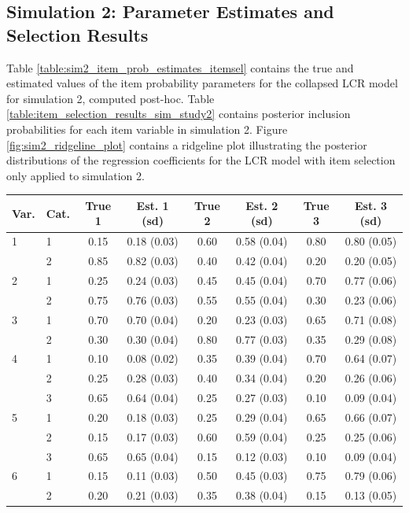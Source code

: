\documentclass[11pt]{article}
\theoremstyle{plain}
\theoremstyle{definition}
\begin{document}
\subsection{Simulation 2: Parameter Estimates and Selection Results}
Table \ref{table:sim2_item_prob_estimates_itemsel} contains the true and estimated values of the item probability parameters for the collapsed LCR model for simulation 2, computed post-hoc. Table \ref{table:item_selection_results_sim_study2} contains posterior inclusion probabilities for each item variable in simulation 2. Figure \ref{fig:sim2_ridgeline_plot} contains a ridgeline plot illustrating the posterior distributions of the regression coefficients for the LCR model with item selection only applied to simulation 2.
\begin{table}[H]\centering
\begin{tabular}{llcccccc}
\toprule
\textbf{Var.} & \textbf{Cat.} & \textbf{True 1} & \textbf{Est. 1 (sd)} & \textbf{True 2} & \textbf{Est. 2 (sd)} & \textbf{True 3} & \textbf{Est. 3 (sd)} \\
\midrule
1 & 1 & 0.15 & 0.18 (0.03) & 0.60 & 0.58 (0.04) & 0.80 & 0.80 (0.05)   \\
  & 2 & 0.85 & 0.82 (0.03) & 0.40 & 0.42 (0.04) & 0.20 & 0.20 (0.05)   \\
2 & 1 & 0.25 & 0.24 (0.03) & 0.45 & 0.45 (0.04) & 0.70 & 0.77 (0.06)  \\
  & 2 & 0.75 & 0.76 (0.03) & 0.55 & 0.55 (0.04) & 0.30 & 0.23 (0.06)   \\
3 & 1 & 0.70 & 0.70 (0.04) & 0.20 & 0.23 (0.03) & 0.65 & 0.71 (0.08)   \\
  & 2 & 0.30 & 0.30 (0.04) & 0.80 & 0.77 (0.03) & 0.35 & 0.29 (0.08)   \\
4 & 1 & 0.10 & 0.08 (0.02) & 0.35 & 0.39 (0.04) & 0.70 & 0.64 (0.07)   \\
  & 2 & 0.25 & 0.28 (0.03) & 0.40 & 0.34 (0.04) & 0.20 & 0.26 (0.06)   \\
  & 3 & 0.65 & 0.64 (0.04) & 0.25 & 0.27 (0.03) & 0.10 & 0.09 (0.04)   \\
5 & 1 & 0.20 & 0.18 (0.03) & 0.25 & 0.29  (0.04) & 0.65 & 0.66 (0.07)  \\
  & 2 & 0.15 & 0.17 (0.03) & 0.60 & 0.59  (0.04) & 0.25 & 0.25 (0.06)  \\
  & 3 & 0.65 & 0.65 (0.04) & 0.15 & 0.12  (0.03) & 0.10 & 0.09 (0.04)  \\
6 & 1 & 0.15 & 0.11 (0.03) & 0.50 & 0.45  (0.03) & 0.75 & 0.79 (0.06)   \\
  & 2 & 0.20 & 0.21 (0.03) & 0.35 & 0.38  (0.04) & 0.15 & 0.13 (0.05)  \\

\end{tabular}
\end{table}
\end{document}
